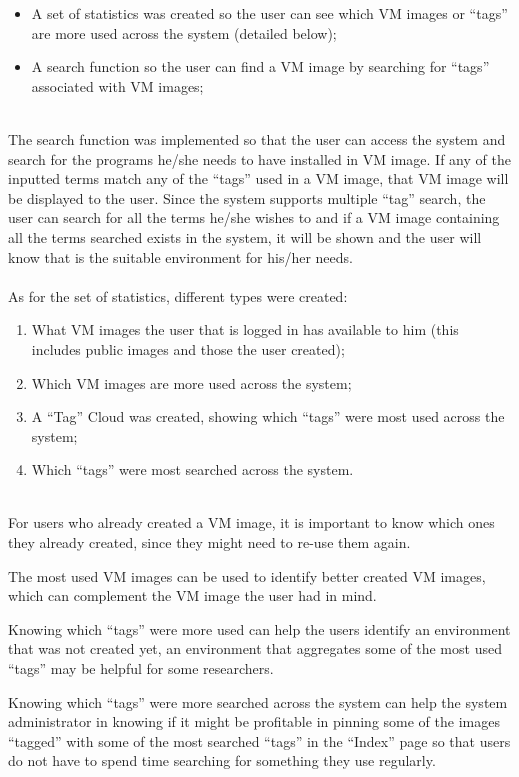 \begin{itemize}
\item A set of statistics was created so the user can see which VM images or ``tags'' are more used across the system (detailed below);
\item A search function so the user can find a VM image by searching for ``tags'' associated with VM images;
\end{itemize}

\ \\
The search function was implemented so that the user can access the system and search for the programs he/she needs to have installed in VM image. If any of the inputted terms match any of the ``tags'' used in a VM image, that VM image will be displayed to the user. Since the system supports multiple ``tag'' search, the user can search for all the terms he/she wishes to and if a VM image containing all the terms searched exists in the system, it will be shown and the user will know that is the suitable environment for his/her needs.\\
\ \\
As for the set of statistics, different types were created:

\begin{enumerate}
\item What VM images the user that is logged in has available to him (this includes public images and those the user created);
\item Which VM images are more used across the system;
\item A ``Tag'' Cloud was created, showing which ``tags'' were most used across the system;
\item Which ``tags'' were most searched across the system.
\end{enumerate}

\ \\
For users who already created a VM image, it is important to know which ones they already created, since they might need to re-use them again.

The most used VM images can be used to identify better created VM images, which can complement the VM image the user had in mind.

Knowing which ``tags'' were more used can help the users identify an environment that was not created yet, an environment that aggregates some of the most used ``tags'' may be helpful for some researchers.

Knowing which ``tags'' were more searched across the system can help the system administrator in knowing if it might be profitable in pinning some of the images ``tagged'' with some of the most searched ``tags'' in the ``Index'' page so that users do not have to spend time searching for something they use regularly.



